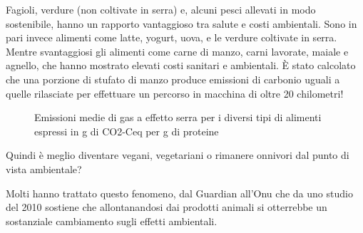 \documentclass[12pt]{book} %
\begin{document}
Fagioli, verdure (non coltivate in serra) e, alcuni pesci allevati in modo sostenibile, hanno un
rapporto vantaggioso tra salute e costi ambientali. Sono in pari invece alimenti come latte, yogurt, uova, e le verdure
coltivate in serra. Mentre svantaggiosi gli alimenti come carne di manzo, carni lavorate, maiale e agnello, che hanno
mostrato elevati costi sanitari e ambientali. È stato calcolato che una porzione di stufato di manzo produce emissioni
di carbonio uguali a quelle rilasciate per effettuare un percorso in macchina di oltre 20 chilometri!

\needspace{4cm}
\begin{figure}[H]
\centering
{}
\caption{Emissioni medie di gas a effetto serra per i diversi tipi di alimenti espressi in g di CO2-Ceq per g di proteine}
\end{figure}

\bigskip

Quindi è meglio diventare vegani, vegetariani o rimanere onnivori dal punto di vista ambientale?

Molti hanno trattato questo fenomeno, dal
Guardian
all'Onu che da uno studio del 2010 sostiene che allontanandosi dai prodotti animali si otterrebbe un sostanziale cambiamento
sugli effetti ambientali.
\end{document}
